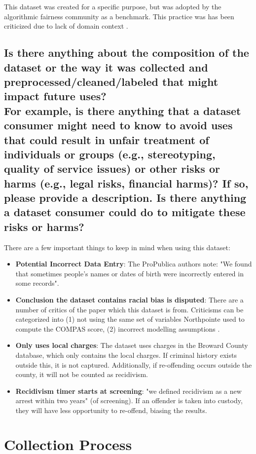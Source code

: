 \documentclass[letterpaper, 10 pt, conference]{ieeeconf}  %
\newcommand{\subtitle}[1]{{\\ \small \normalfont \color{purple} #1}}
\begin{document}
This dataset was created for a specific purpose, but was adopted by the algorithmic fairness community as a benchmark. This practice was has been criticized due to lack of domain context \cite{bao2021s}.   

\subsection{Is there anything about the composition of the dataset or the way it was collected and preprocessed/cleaned/labeled that might impact future uses? \subtitle{For example, is there anything that a dataset consumer might need to know to avoid uses that could result in unfair treatment of individuals or groups (e.g., stereotyping, quality of service issues) or other risks or harms (e.g., legal risks, financial harms)? If so, please provide a description. Is there anything a dataset consumer could do to mitigate these risks or harms?}}

There are a few important things to keep in mind when using this dataset:

\begin{itemize}
    \item \textbf{Potential Incorrect Data Entry}: The ProPublica authors note: "We found that sometimes people’s names or dates of birth were incorrectly entered in some records".
    \item \textbf{Conclusion the dataset contains racial bias is disputed}: There are a number of critics of the paper which this dataset is from. Criticisms can be categorized into (1) not using the same set of variables Northpointe used to compute the COMPAS score, (2) incorrect modelling assumptions \cite{Rudin2020Age}.
    \item \textbf{Only uses local charges}: The dataset uses charges in the Broward County database, which only contains the local charges. If criminal history exists outside this, it is not captured. Additionally, if re-offending occurs outside the county, it will not be counted as recidivism.
    \item \textbf{Recidivism timer starts at screening}: "we defined recidivism as a new arrest within two years" (of screening). If an offender is taken into custody, they will have less opportunity to re-offend, biasing the results. 
\end{itemize}


\section{Collection Process}
\end{document}
